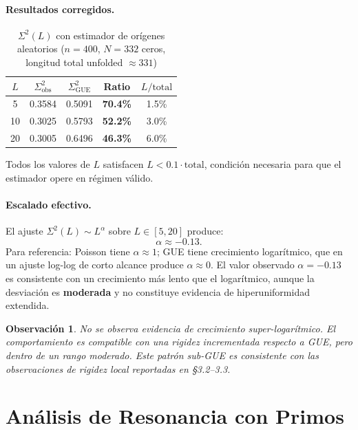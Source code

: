 \documentclass[12pt, a4paper]{article}
\newtheorem{observacion}{Observación}
\begin{document}
\paragraph{Resultados corregidos.}

\begin{table}[H]
\centering
\caption{$\Sigma^2(L)$ con estimador de orígenes aleatorios ($n=400$,
         $N=332$ ceros, longitud total unfolded $\approx 331$)}
\begin{tabular}{ccccc}
\toprule
$L$ & $\Sigma^2_{\text{obs}}$ & $\Sigma^2_{\text{GUE}}$ & Ratio & $L/\text{total}$ \\
\midrule
 5 & 0.3584 & 0.5091 & \textbf{70.4\%} & 1.5\% \\
10 & 0.3025 & 0.5793 & \textbf{52.2\%} & 3.0\% \\
20 & 0.3005 & 0.6496 & \textbf{46.3\%} & 6.0\% \\
\bottomrule
\end{tabular}
\label{tab:sigma2_robusto}
\end{table}

Todos los valores de $L$ satisfacen $L < 0.1 \cdot \text{total}$,
condición necesaria para que el estimador opere en régimen válido.

\paragraph{Escalado efectivo.}
El ajuste $\Sigma^2(L) \sim L^{\alpha}$ sobre $L \in [5, 20]$ produce:
\[
  \alpha \approx -0.13.
\]
Para referencia: Poisson tiene $\alpha \approx 1$; GUE tiene crecimiento
logarítmico, que en un ajuste log-log de corto alcance produce
$\alpha \approx 0$. El valor observado $\alpha = -0.13$ es consistente
con un crecimiento más lento que el logarítmico, aunque la desviación
es \textbf{moderada} y no constituye evidencia de hiperuniformidad
extendida.

\begin{observacion}
No se observa evidencia de crecimiento super-logarítmico.
El comportamiento es compatible con una rigidez incrementada respecto
a GUE, pero dentro de un rango moderado. Este patrón sub-GUE es
consistente con las observaciones de rigidez local reportadas en
§3.2–3.3.
\end{observacion}

\section{Análisis de Resonancia con Primos}
\end{document}
